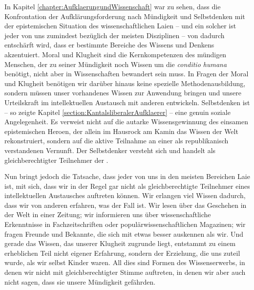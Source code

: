In Kapitel \ref{chapter:AufklaerungundWissenschaft} war zu sehen, dass die
Konfrontation der Aufklärungsforderung nach Mündigkeit und Selbstdenken mit der
epistemischen Situation des wissenschaftlichen Laien -- und ein solcher ist
jeder von uns zumindest bezüglich der meisten Disziplinen -- von
 dadurch entschärft wird, dass er bestimmte Bereiche des Wissens und Denkens
akzentuiert. Moral und Klugheit sind die Kernkompetenzen des mündigen Menschen,
der zu seiner Mündigkeit noch Wissen um die \emph{conditio humana} benötigt,
nicht aber in Wissenschaften bewandert sein muss. In Fragen der Moral
und Klugheit benötigen wir darüber hinaus keine spezielle Methodenausbildung,
sondern müssen unser vorhandenes Wissen zur Anwendung bringen und unsere
Urteilskraft im intellektuellen Austausch mit anderen entwickeln. Selbstdenken ist -- so zeigte Kapitel
\ref{section:KantalsliberalerAufklaerer} -- eine genuin soziale Angelegenheit.
Es verweist nicht auf die autarke Wissensgewinnung des einsamen epistemischen
Heroen, der allein im Hausrock am Kamin das Wissen der Welt rekonstruiert,
sondern auf die aktive Teilnahme an einer als republikanisch verstandenen
Vernunft. Der Selbstdenker versteht sich und handelt als gleichberechtigter
Teilnehmer der .

Nun bringt jedoch die Tatsache, dass jeder von uns in den meisten Bereichen Laie
ist, mit sich, dass wir in der Regel gar nicht als gleichberechtigte Teilnehmer
eines intellektuellen Austausches auftreten können. Wir erlangen viel Wissen
dadurch, dass wir von anderen erfahren, was der Fall ist. Wir lesen über das
Geschehen in der Welt in einer Zeitung; wir informieren uns über
wissenschaftliche Erkenntnisse in Fachzeitschriften oder
populärwissenschaftlichen Magazinen; wir fragen Freunde und Bekannte, die sich
mit etwas besser auskennen als wir. Und gerade das Wissen, das unserer Klugheit
zugrunde liegt, entstammt zu einem erheblichen Teil nicht eigener Erfahrung,
sondern der Erziehung, die uns zuteil wurde, als wir selbst Kinder waren. All
dies sind Formen des Wissenserwerbs, in denen wir nicht mit gleichberechtigter
Stimme auftreten, in denen wir aber auch nicht sagen, dass sie unsere Mündigkeit
gefährden.

